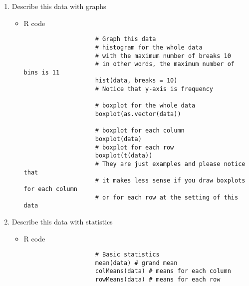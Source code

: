 \begin{enumerate}
\begin{itemize}
\begin{verbatim}
				# Show the data
				data
				\end{verbatim}
			\newpage \item R code (directly inputing into R)
				\begin{verbatim}
					# Directly input a data as a matrix
					data <- matrix(c(
					74.03	,	74.002	,	74.019	,	73.992	,	74.008	,
					73.995	,	73.992	,	74.001	,	74.011	,	74.004	,
					73.988	,	74.024	,	74.021	,	74.005	,	74.002	,
					74.002	,	73.996	,	73.993	,	74.015	,	74.009	,
					73.992	,	74.007	,	74.015	,	73.989	,	74.014	,
					74.009	,	73.994	,	73.997	,	73.985	,	73.993	,
					73.995	,	74.006	,	73.994	,	74	,	74.005	,
					73.985	,	74.003	,	73.993	,	74.015	,	73.988	,
					74.008	,	73.995	,	74.009	,	74.005	,	74.004	,
					73.998	,	74	,	73.99	,	74.007	,	73.995	,
					73.994	,	73.998	,	73.994	,	73.995	,	73.99	,
					74.004	,	74	,	74.007	,	74	,	73.996	,
					73.983	,	74.002	,	73.998	,	73.997	,	74.012	,
					74.006	,	73.967	,	73.994	,	74	,	73.984	,
					74.012	,	74.014	,	73.998	,	73.999	,	74.007	,
					74	,	73.984	,	74.005	,	73.998	,	73.996	,
					73.994	,	74.012	,	73.986	,	74.005	,	74.007	,
					74.006	,	74.01	,	74.018	,	74.003	,	74	,
					73.984	,	74.002	,	74.003	,	74.005	,	73.997	,
					74	,	74.01	,	74.013	,	74.02	,	74.003	,
					73.982	,	74.001	,	74.015	,	74.005	,	73.996	,
					74.004	,	73.999	,	73.99	,	74.006	,	74.009	,
					74.01	,	73.989	,	73.99	,	74.009	,	74.014	,
					74.015	,	74.008	,	73.993	,	74	,	74.01	,
					73.982	,	73.984	,	73.995	,	74.017	,	74.013	
					), ncol = 5, byrow = T)
					
					# Show the data
					data
				\end{verbatim}
		\end{itemize}		
	\newpage \item Describe this data with graphs
		\begin{itemize}
			\item R code
				\begin{verbatim}
				 	# Graph this data
				 	# histogram for the whole data 
				 	# with the maximum number of breaks 10
				 	# in other words, the maximum number of bins is 11 
				 	hist(data, breaks = 10) 
				 	# Notice that y-axis is frequency
				 	
				 	# boxplot for the whole data
				 	boxplot(as.vector(data)) 
				 	
				 	# boxplot for each column
				 	boxplot(data) 
				 	# boxplot for each row
				 	boxplot(t(data))
				 	# They are just examples and please notice that 
				 	# it makes less sense if you draw boxplots for each column
				 	# or for each row at the setting of this data
				\end{verbatim}
		\end{itemize}
	\item Describe this data with statistics
		\begin{itemize}
			\item R code
				\begin{verbatim}
					# Basic statistics
					mean(data) # grand mean
					colMeans(data) # means for each column
					rowMeans(data) # means for each row
					

\end{verbatim}
\end{itemize}
\end{enumerate}
